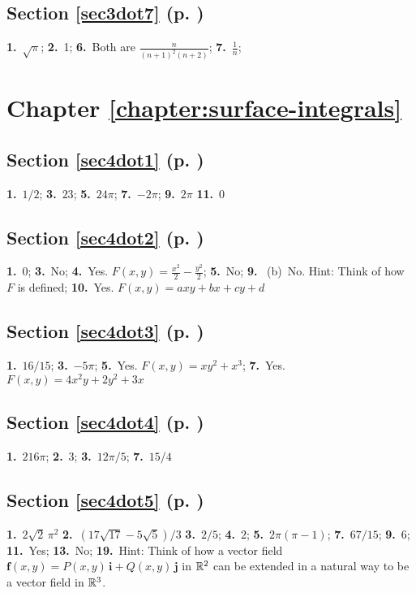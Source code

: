 \begin{multicols}{2}
\subsection*{Section \ref{sec3dot7} (p. \pageref{sec3dot7})}

\textbf{1.}~$\sqrt{\pi}$;\quad
\textbf{2.}~1;\quad
\textbf{6.}~Both are $\frac{n}{(n+1)^2 (n+2)}$;\quad
\textbf{7.}~$\frac{1}{n}$;\quad

\section*{Chapter \ref{chapter:surface-integrals}}
\subsection*{Section \ref{sec4dot1} (p. \pageref{sec4dot1})}

\textbf{1.}~$1/2$;\quad
\textbf{3.}~$23$;\quad
\textbf{5.}~$24\pi$;\quad
\textbf{7.}~$-2\pi$;\quad
\textbf{9.}~$2\pi$
\textbf{11.}~$0$
\subsection*{Section \ref{sec4dot2} (p. \pageref{sec4dot2})}

\textbf{1.}~$0$;\quad
\textbf{3.}~No;\quad
\textbf{4.}~Yes. $F(x,y)=\frac{x^2}{2}-\frac{y^2}{2}$;\quad
\textbf{5.}~No;\quad
\textbf{9.}~
(b)~No. Hint: Think of how $F$ is defined;\quad
\textbf{10.}~Yes. $F(x,y)=axy+bx+cy+d$
\subsection*{Section \ref{sec4dot3} (p. \pageref{sec4dot3})}

\textbf{1.}~$16/15$;\quad
\textbf{3.}~$-5\pi$;\quad
\textbf{5.}~Yes. $F(x,y)=xy^2 + x^3$;\quad
\textbf{7.}~Yes. $F(x,y)=4x^2 y + 2y^2 + 3x$

\subsection*{Section \ref{sec4dot4} (p. \pageref{sec4dot4})}

\textbf{1.}~$216\pi$;\quad
\textbf{2.}~$3$;\quad
\textbf{3.}~$12\pi/5$;\quad
\textbf{7.}~$15/4$
\subsection*{Section \ref{sec4dot5} (p. \pageref{sec4dot5})}

\textbf{1.}~$2\sqrt{2}\,\pi^2$\quad
\textbf{2.}~$(17\sqrt{17} - 5\sqrt{5})/3$\quad
\textbf{3.}~$2/5$;\quad
\textbf{4.}~$2$;\quad
\textbf{5.}~$2\pi (\pi - 1)$;\quad
\textbf{7.}~$67/15$;\quad
\textbf{9.}~$6$;\quad
\textbf{11.}~Yes;\quad
\textbf{13.}~No;\quad
\textbf{19.}~Hint: Think of how a vector field $\textbf{f}(x,y) = P(x,y)\,\textbf{i} + Q(x,y)\,\textbf{j}$ in
$\mathbb{R}^{2}$ can be extended in a natural way to be a vector field in $\mathbb{R}^{3}$.

\end{multicols}
